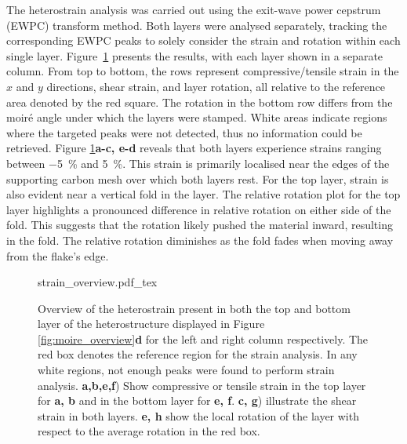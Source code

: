 The heterostrain analysis was carried out using the exit-wave power cepstrum (EWPC) transform method. Both layers were analysed separately, tracking the corresponding EWPC peaks to solely consider the strain and rotation within each single layer. Figure~\ref{fig:strain_overview} presents the results, with each layer shown in a separate column. 
%
From top to bottom, the rows represent compressive/tensile strain in the $x$ and $y$ directions, shear strain, and layer rotation, all relative to the reference area denoted by the red square. 
%
The rotation in the bottom row differs from the moiré angle under which the layers were stamped. White areas indicate regions where the targeted peaks were not detected, thus no information could be retrieved.
%
Figure \ref{fig:strain_overview}\textbf{a-c, e-d} reveals that both layers experience strains ranging between \SI{-5}{\percent} and \SI{5}{\percent}. This strain is primarily localised near the edges of the supporting carbon mesh over which both layers rest. 
%
For the top layer, strain is also evident near a vertical fold in the layer. 
%
The relative rotation plot for the top layer highlights a pronounced difference in relative rotation on either side of the fold.
%
This suggests that the rotation likely pushed the material inward, resulting in the fold. 
%
The relative rotation diminishes as the fold fades when moving away from the flake's edge.

\begin{figure}[p]
    \centering
    \def\svgwidth{.74\linewidth}
    {strain_overview.pdf_tex}
    \caption{Overview of the heterostrain present in both the top and bottom layer of the heterostructure displayed in Figure \ref{fig:moire_overview}\textbf{d} for the left and right column respectively. The red box denotes the reference region for the strain analysis. In any white regions, not enough peaks were found to perform strain analysis. \textbf{a,b,e,f}) Show compressive or tensile strain in the top layer for \textbf{a, b} and in the bottom layer for \textbf{e, f}. \textbf{c, g}) illustrate the shear strain in both layers. \textbf{e, h} show the local rotation of the layer with respect to the average rotation in the red box.}
    \label{fig:strain_overview}
\end{figure}
\newpage


